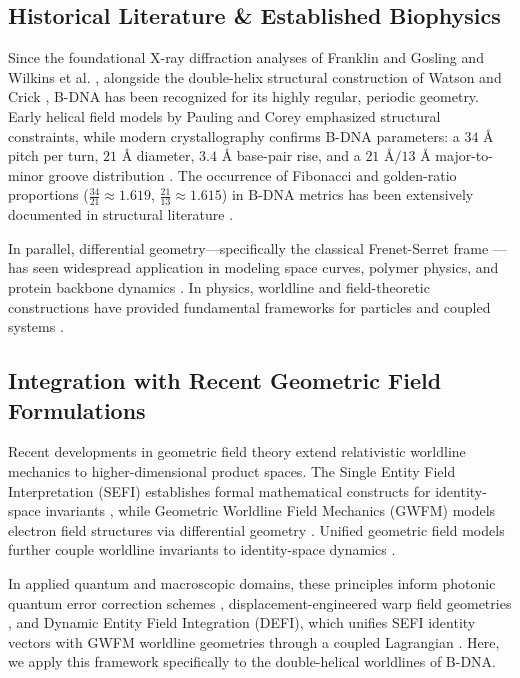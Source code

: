\documentclass[11pt,a4paper]{article}
\begin{document}
\subsection{Historical Literature \& Established Biophysics}
Since the foundational X-ray diffraction analyses of Franklin and Gosling \cite{franklin1953} and Wilkins et al. \cite{wilkins1953}, alongside the double-helix structural construction of Watson and Crick \cite{watson1953}, B-DNA has been recognized for its highly regular, periodic geometry. Early helical field models by Pauling and Corey \cite{pauling1953} emphasized structural constraints, while modern crystallography confirms B-DNA parameters: a $34\text{ \AA}$ pitch per turn, $21\text{ \AA}$ diameter, $3.4\text{ \AA}$ base-pair rise, and a $21\text{ \AA} / 13\text{ \AA}$ major-to-minor groove distribution \cite{saenger1984}. The occurrence of Fibonacci and golden-ratio proportions ($\frac{34}{21} \approx 1.619$, $\frac{21}{13} \approx 1.615$) in B-DNA metrics has been extensively documented in structural literature \cite{pennisi2008}.

In parallel, differential geometry—specifically the classical Frenet-Serret frame \cite{frenet1852, serret1851}—has seen widespread application in modeling space curves, polymer physics, and protein backbone dynamics \cite{kamien2002}. In physics, worldline and field-theoretic constructions have provided fundamental frameworks for particles and coupled systems \cite{feynman1950, schwinger1951}.

\subsection{Integration with Recent Geometric Field Formulations}
Recent developments in geometric field theory extend relativistic worldline mechanics to higher-dimensional product spaces. The Single Entity Field Interpretation (SEFI) establishes formal mathematical constructs for identity-space invariants \cite{dutton2026sefi}, while Geometric Worldline Field Mechanics (GWFM) models electron field structures via differential geometry \cite{dutton2026gwfm}. Unified geometric field models further couple worldline invariants to identity-space dynamics \cite{dutton2026unified}.

In applied quantum and macroscopic domains, these principles inform photonic quantum error correction schemes \cite{dutton2026photonic}, displacement-engineered warp field geometries \cite{dutton2026warp}, and Dynamic Entity Field Integration (DEFI), which unifies SEFI identity vectors with GWFM worldline geometries through a coupled Lagrangian \cite{dutton2026defi}. Here, we apply this framework specifically to the double-helical worldlines of B-DNA.
\end{document}
